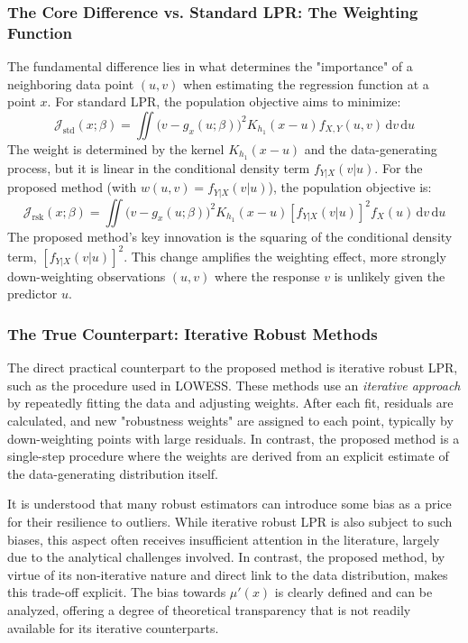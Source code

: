 \documentclass[preprint,1p,times,authoryear]{elsarticle}
\begin{document}
\subsubsection{The Core Difference vs. Standard LPR: The Weighting Function}
The fundamental difference lies in what determines the "importance" of a neighboring data point $(u,v)$ when estimating the regression function at a point $x$. For standard LPR, the population objective aims to minimize:
    \[\mathcal{J}_{\text{std}}(x;\beta) = \iint \bigl(v-g_x(u;\beta)\bigr)^{2} K_{h_1}(x-u) f_{X,Y}(u,v)\,\mathrm d v\,\mathrm d u\]
    The weight is determined by the kernel $K_{h_1}(x-u)$ and the data-generating process, but it is linear in the conditional density term $f_{Y|X}(v|u)$. \newline \newline
For the proposed method (with $w(u,v) = f_{Y|X}(v|u)$), the population objective is:
    \[\mathcal{J}_{\text{rsk}}(x;\beta) = \iint \bigl(v-g_x(u;\beta)\bigr)^{2} K_{h_1}(x-u) [f_{Y|X}(v|u)]^2 f_X(u)\,\mathrm d v\,\mathrm d u\]
    The proposed method's key innovation is the squaring of the conditional density term, $[f_{Y|X}(v|u)]^2$. This change amplifies the weighting effect, more strongly down-weighting observations $(u,v)$ where the response $v$ is unlikely given the predictor $u$.


\subsubsection{The True Counterpart: Iterative Robust Methods}
The direct practical counterpart to the proposed method is iterative robust LPR, such as the procedure used in LOWESS. These methods use an \emph{iterative approach} by repeatedly fitting the data and adjusting weights. After each fit, residuals are calculated, and new "robustness weights" are assigned to each point, typically by down-weighting points with large residuals. In contrast, the proposed method is a single-step procedure where the weights are derived from an explicit estimate of the data-generating distribution itself. 

It is understood that many robust estimators can introduce some bias as a price for their resilience to outliers. While iterative robust LPR is also subject to such biases, this aspect often receives insufficient attention in the literature, largely due to the analytical challenges involved. In contrast, the proposed method, by virtue of its non-iterative nature and direct link to the data distribution, makes this trade-off explicit. The bias towards $\mu'(x)$ is clearly defined and can be analyzed, offering a degree of theoretical transparency that is not readily available for its iterative counterparts.
\end{document}
